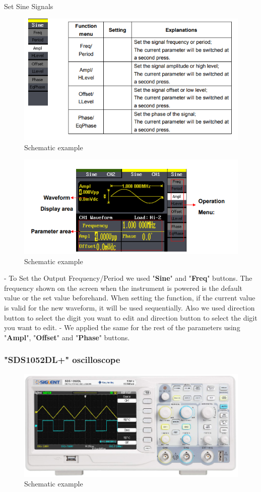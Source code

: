 Set Sine Signals
\begin{figure}[H]
	\centering
	\includegraphics[width=12cm]{images/14.png}
	\caption{Schematic example}
	\label{fig:wow4}
\end{figure}
\begin{figure}[H]
	\centering
	\includegraphics[width=12cm]{images/15.png}
	\caption{Schematic example}
	\label{fig:wow5}
\end{figure}

 - To Set the Output Frequency/Period we used "\textbf{Sine}" and "\textbf{Freq}" buttons.
   The frequency shown on the screen when the instrument is powered is
   the default value or the set value beforehand. When setting the function,
   if the current value is valid for the new waveform, it will be used
   sequentially. Also we used direction button to select the digit you want to edit and direction button to select the digit you want to edit.
 - We applied the same for the rest of the parameters using "\textbf{Ampl}", "\textbf{Offset}" and "\textbf{Phase}" buttons.

\subsubsection*{"SDS1052DL+" oscilloscope}
\begin{figure}[H]
	\centering
	\includegraphics[width=12cm]{images/16.png}
	\caption{Schematic example}
	\label{fig:wow6}
\end{figure}

